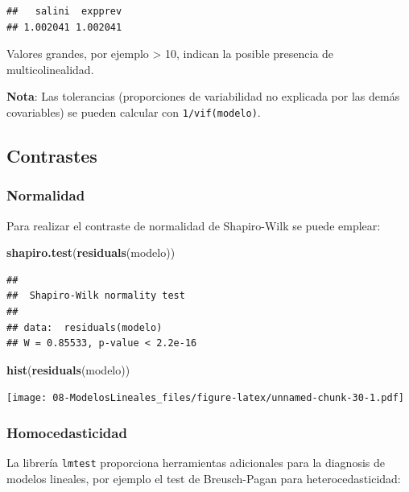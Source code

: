 \documentclass[]{book}
\newenvironment{Shaded}{\begin{snugshade}}{\end{snugshade}}
\newcommand{\KeywordTok}[1]{\textcolor[rgb]{0.13,0.29,0.53}{\textbf{#1}}}
\newcommand{\NormalTok}[1]{#1}
\begin{document}
\begin{verbatim}
##   salini  expprev 
## 1.002041 1.002041
\end{verbatim}

Valores grandes, por ejemplo \textgreater{} 10, indican la posible
presencia de multicolinealidad.

\textbf{Nota}: Las tolerancias (proporciones de variabilidad no
explicada por las demás covariables) se pueden calcular con
\texttt{1/vif(modelo)}.

\subsection{Contrastes}\label{contrastes-1}

\subsubsection{Normalidad}\label{normalidad-1}

Para realizar el contraste de normalidad de Shapiro-Wilk se puede
emplear:

\begin{Shaded}
\begin{Highlighting}[]
\KeywordTok{shapiro.test}\NormalTok{(}\KeywordTok{residuals}\NormalTok{(modelo))}
\end{Highlighting}
\end{Shaded}

\begin{verbatim}
## 
##  Shapiro-Wilk normality test
## 
## data:  residuals(modelo)
## W = 0.85533, p-value < 2.2e-16
\end{verbatim}

\begin{Shaded}
\begin{Highlighting}[]
\KeywordTok{hist}\NormalTok{(}\KeywordTok{residuals}\NormalTok{(modelo))}
\end{Highlighting}
\end{Shaded}

\texttt{[image: 08-ModelosLineales\_files/figure-latex/unnamed-chunk-30-1.pdf]}

\subsubsection{Homocedasticidad}\label{homocedasticidad}

La librería \texttt{lmtest} proporciona herramientas adicionales para la
diagnosis de modelos lineales, por ejemplo el test de Breusch-Pagan para
heterocedasticidad:
\end{document}
